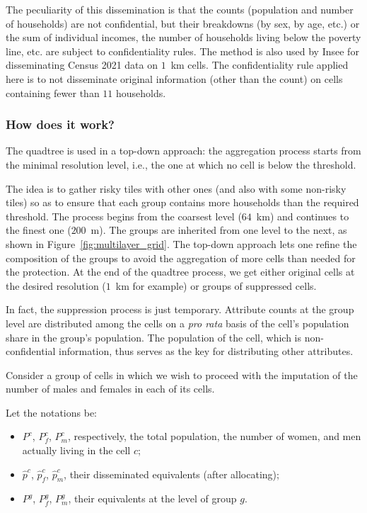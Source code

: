 The peculiarity of this dissemination is that the counts (population and number of households) are not confidential, but their breakdowns (by sex, by age, etc.) or the sum of individual incomes, the number of households living below the poverty line, etc. are subject to confidentiality rules. The method is also used by Insee for disseminating Census 2021 data on $1$~km cells. The confidentiality rule applied here is to not disseminate original information (other than the count) on cells containing fewer than $11$ households.

\subsubsection{How does it work?}

The quadtree is used in a top-down approach: the aggregation process starts from the minimal resolution level, i.e., the one at which no cell is below the threshold.

The idea is to gather risky tiles with other ones (and also with some non-risky tiles) so as to ensure that each group contains more households than the required threshold. The process begins from the coarsest level ($64$~km) and continues to the finest one ($200$~m). The groups are inherited from one level to the next, as shown in Figure~\ref{fig:multilayer_grid}. The top-down approach lets one refine the composition of the groups to avoid the aggregation of more cells than needed for the protection. At the end of the quadtree process, we get either original cells at the desired resolution ($1$~km for example) or groups of suppressed cells.

In fact, the suppression process is just temporary. Attribute counts at the group level are distributed among the cells on a \textit{pro rata} basis of the cell's population share in the group's population. The population of the cell, which is non-confidential information, thus serves as the key for distributing other attributes.

Consider a group of cells in which we wish to proceed with the imputation of the number of males and females in each of its cells.

Let the notations be:
   \begin{itemize}
    \item $P^c$, $P^c_f$, $P^c_m$, respectively, the total population, the number of women, and men actually living in the cell $c$;
    \item $\hat{p}^c$, $\hat{p}^c_f$, $\hat{p}^c_m$, their disseminated equivalents (after allocating);
    \item $P^g$, $P^g_f$, $P^g_m$, their equivalents at the level of group $g$.
\end{itemize}

